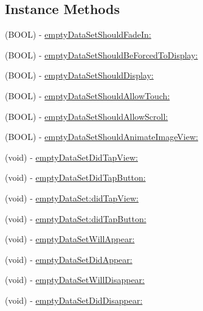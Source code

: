 \subsection*{Instance Methods}
\begin{DoxyCompactItemize}
\item 
(B\+O\+OL) -\/ \mbox{\hyperlink{protocol_d_z_n_empty_data_set_delegate_01-p_a47b08b7ac9885d93f82a130379aef5f6}{empty\+Data\+Set\+Should\+Fade\+In\+:}}
\item 
(B\+O\+OL) -\/ \mbox{\hyperlink{protocol_d_z_n_empty_data_set_delegate_01-p_a21fcd9ef6820b256738e4c10540911fc}{empty\+Data\+Set\+Should\+Be\+Forced\+To\+Display\+:}}
\item 
(B\+O\+OL) -\/ \mbox{\hyperlink{protocol_d_z_n_empty_data_set_delegate_01-p_acfa1fabccb424a1a7dd9acec9772b42d}{empty\+Data\+Set\+Should\+Display\+:}}
\item 
(B\+O\+OL) -\/ \mbox{\hyperlink{protocol_d_z_n_empty_data_set_delegate_01-p_a63f930a9d9dfb2e76323f616cfc535bc}{empty\+Data\+Set\+Should\+Allow\+Touch\+:}}
\item 
(B\+O\+OL) -\/ \mbox{\hyperlink{protocol_d_z_n_empty_data_set_delegate_01-p_a9eac99fe443530ca18e504c7bdedb9be}{empty\+Data\+Set\+Should\+Allow\+Scroll\+:}}
\item 
(B\+O\+OL) -\/ \mbox{\hyperlink{protocol_d_z_n_empty_data_set_delegate_01-p_abf278e7cafebb5770f3f25dc76c96f51}{empty\+Data\+Set\+Should\+Animate\+Image\+View\+:}}
\item 
(void) -\/ \mbox{\hyperlink{protocol_d_z_n_empty_data_set_delegate_01-p_a8a130679d622b9d270f03745045bfbb3}{empty\+Data\+Set\+Did\+Tap\+View\+:}}
\item 
(void) -\/ \mbox{\hyperlink{protocol_d_z_n_empty_data_set_delegate_01-p_ac8365a63f5518b51f04d4a9e489b2c20}{empty\+Data\+Set\+Did\+Tap\+Button\+:}}
\item 
(void) -\/ \mbox{\hyperlink{protocol_d_z_n_empty_data_set_delegate_01-p_ac747454816e6c3fb89e83b8489b6d560}{empty\+Data\+Set\+:did\+Tap\+View\+:}}
\item 
(void) -\/ \mbox{\hyperlink{protocol_d_z_n_empty_data_set_delegate_01-p_a3de0fb46917c4b7f2c8997a4d7f187ab}{empty\+Data\+Set\+:did\+Tap\+Button\+:}}
\item 
(void) -\/ \mbox{\hyperlink{protocol_d_z_n_empty_data_set_delegate_01-p_af626f41aaead4d169befc534eccf2a00}{empty\+Data\+Set\+Will\+Appear\+:}}
\item 
(void) -\/ \mbox{\hyperlink{protocol_d_z_n_empty_data_set_delegate_01-p_aa036ba06216e33dd8e3eac2cb03768ee}{empty\+Data\+Set\+Did\+Appear\+:}}
\item 
(void) -\/ \mbox{\hyperlink{protocol_d_z_n_empty_data_set_delegate_01-p_ace940190eff5c572b4ed54407eba0f61}{empty\+Data\+Set\+Will\+Disappear\+:}}
\item 
(void) -\/ \mbox{\hyperlink{protocol_d_z_n_empty_data_set_delegate_01-p_a3831c92d486ed1fdd4dd6b3770f5368b}{empty\+Data\+Set\+Did\+Disappear\+:}}
\end{DoxyCompactItemize}


